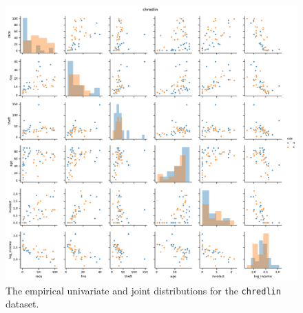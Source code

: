 \documentclass[letterpaper]{article}
\begin{document}
\begin{figure}
  \centering
  \includegraphics[width=\textwidth]{p1_pair_plots.pdf}
  \caption{The empirical univariate and joint distributions for the
    \texttt{chredlin} dataset.}
  \label{fig:p1_pair_plots}
\end{figure}
\end{document}
